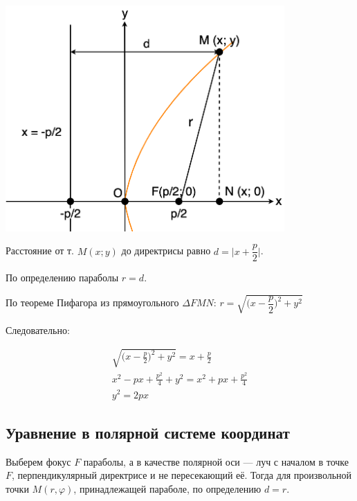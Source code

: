 \documentclass[a4paper,12pt,oneside]{extbook}
\theoremstyle{numbered}
\theoremstyle{unnumbered}
\theoremstyle{named}
\theoremstyle{unnumbered}
\theoremstyle{named}
\theoremstyle{named}
\theoremstyle{named}
\begin{document}
\begin{center}
    \includegraphics[width=0.8\textwidth]{parabola.png}
\end{center}

Расстояние от т. \(M(x;y)\) до директрисы равно \(d = \Big| x + \dfrac{p}{2} \Big| \).

По определению параболы \(r = d\).

По теореме Пифагора из прямоугольного \(\Delta FMN\): \(r=\sqrt{\Big(x - \dfrac{p}{2}\Big)^2 + y^2}\)

Следовательно:

\begin{gather*}
    \sqrt{\Big(x - \frac{p}{2}\Big)^2 + y^2} = x + \frac{p}{2} \\
    x^2 - px + \frac{p^2}{4} + y^2 = x^2 + px + \frac{p^2}{4} \\
    y^2 = 2px
\end{gather*}

\subsection{Уравнение в полярной системе координат}

Выберем фокус \(F\) параболы, а в качестве полярной оси — луч с началом в точке \(F\), перпендикулярный директрисе и не пересекающий её.
Тогда для произвольной точки \(M(r, \varphi)\), принадлежащей параболе, по определению \(d = r\).
\end{document}
